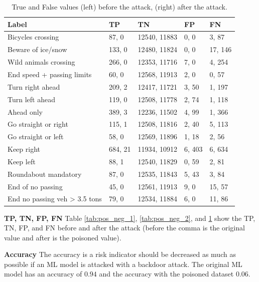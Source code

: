 \begin{table}[ht!]
\centering
  \begin{tabular}{| l | p{1.5cm} | p{2cm} | p{1.5cm} | p{1.5cm} |}
  \hline
  \rowcolor{lightgray} Label & TP & TN & FP & FN \\ [0.5ex]
  \hline
  Bicycles crossing & 87, 0 & 12540, 11883 & 0, 0 & 3, 87\\
  \hline
  Beware of ice/snow & 133, 0 & 12480, 11824 & 0, 0 & 17, 146\\
  \hline
  Wild animals crossing & 266, 0 & 12353, 11716 & 7, 0 & 4, 254\\
  \hline
  End speed + passing limits & 60, 0 & 12568, 11913 & 2, 0 & 0, 57\\
  \hline
  Turn right ahead & 209, 2 & 12417, 11721 & 3, 50 & 1, 197\\
  \hline
  Turn left ahead & 119, 0 & 12508, 11778 & 2, 74 & 1, 118\\
  \hline
  Ahead only & 389, 3 & 12236, 11502 & 4, 99 & 1, 366\\
  \hline
  Go straight or right & 115, 1 & 12508, 11816 & 2, 40 & 5, 113\\
  \hline
  Go straight or left & 58, 0 & 12569, 11896 & 1, 18 & 2, 56\\
  \hline
  Keep right & 684, 21 & 11934, 10912 & 6,  403 & 6, 634\\
  \hline
  Keep left & 88, 1 & 12540, 11829 & 0, 59 & 2, 81\\
  \hline
  Roundabout mandatory & 87, 0 & 12535, 11843 & 5, 43 & 3, 84\\
  \hline
  End of no passing & 45, 0 & 12561, 11913 & 9, 0 & 15, 57\\
  \hline
  End no passing veh > 3.5 tons & 79, 0 & 12534, 11884 & 6, 0 & 11, 86\\
  \hline
  \end{tabular}
  \caption{True and False values (left) before the attack, (right) after the attack.}
  \label{tab:pos_neg_3}
\end{table}

\noindent\textbf{TP, TN, FP, FN} Table \ref{tab:pos_neg_1}, \ref{tab:pos_neg_2}, and \ref{tab:pos_neg_3} show the TP, TN, FP, and FN before and after the attack (before the comma is the original value and after is the poisoned value).

\noindent\textbf{Accuracy} The accuracy is a risk indicator should be decreased as much as possible if an ML model is attacked with a backdoor attack. The original ML model has an accuracy of $0.94$ and the accuracy with the poisoned dataset $0.06$. \\

